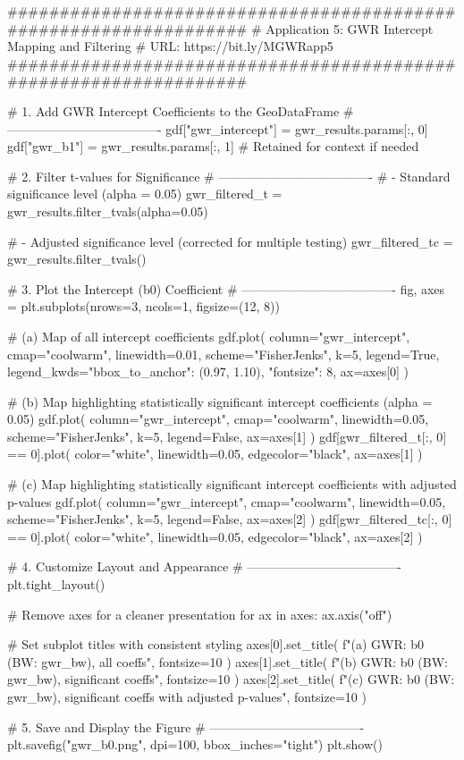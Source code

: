 \documentclass[smallextended, natbib]{svjour3}       %
\begin{document}
\begin{python}
##################################################################
# Application 5: GWR Intercept Mapping and Filtering
# URL: https://bit.ly/MGWRapp5
##################################################################

# 1. Add GWR Intercept Coefficients to the GeoDataFrame
# -------------------------------------
gdf["gwr_intercept"] = gwr_results.params[:, 0]
gdf["gwr_b1"] = gwr_results.params[:, 1]  # Retained for context if needed

# 2. Filter t-values for Significance
# -------------------------------------
# - Standard significance level (alpha = 0.05)
gwr_filtered_t = gwr_results.filter_tvals(alpha=0.05)

# - Adjusted significance level (corrected for multiple testing)
gwr_filtered_tc = gwr_results.filter_tvals()

# 3. Plot the Intercept (b0) Coefficient
# -------------------------------------
fig, axes = plt.subplots(nrows=3, ncols=1, figsize=(12, 8))

# (a) Map of all intercept coefficients
gdf.plot(
    column="gwr_intercept",
    cmap="coolwarm",
    linewidth=0.01,
    scheme="FisherJenks",
    k=5,
    legend=True,
    legend_kwds={"bbox_to_anchor": (0.97, 1.10), "fontsize": 8},
    ax=axes[0]
)

# (b) Map highlighting statistically significant intercept coefficients (alpha = 0.05)
gdf.plot(
    column="gwr_intercept",
    cmap="coolwarm",
    linewidth=0.05,
    scheme="FisherJenks",
    k=5,
    legend=False,
    ax=axes[1]
)
gdf[gwr_filtered_t[:, 0] == 0].plot(
    color="white",
    linewidth=0.05,
    edgecolor="black",
    ax=axes[1]
)

# (c) Map highlighting statistically significant intercept coefficients with adjusted p-values
gdf.plot(
    column="gwr_intercept",
    cmap="coolwarm",
    linewidth=0.05,
    scheme="FisherJenks",
    k=5,
    legend=False,
    ax=axes[2]
)
gdf[gwr_filtered_tc[:, 0] == 0].plot(
    color="white",
    linewidth=0.05,
    edgecolor="black",
    ax=axes[2]
)

# 4. Customize Layout and Appearance
# -------------------------------------
plt.tight_layout()

# Remove axes for a cleaner presentation
for ax in axes:
    ax.axis("off")

# Set subplot titles with consistent styling
axes[0].set_title(
    f"(a) GWR: b0 (BW: {gwr_bw}), all coeffs", fontsize=10
)
axes[1].set_title(
    f"(b) GWR: b0 (BW: {gwr_bw}), significant coeffs", fontsize=10
)
axes[2].set_title(
    f"(c) GWR: b0 (BW: {gwr_bw}), significant coeffs with adjusted p-values",
    fontsize=10
)

# 5. Save and Display the Figure
# -------------------------------------
plt.savefig("gwr_b0.png", dpi=100, bbox_inches="tight")
plt.show()
\end{python}
\end{document}
